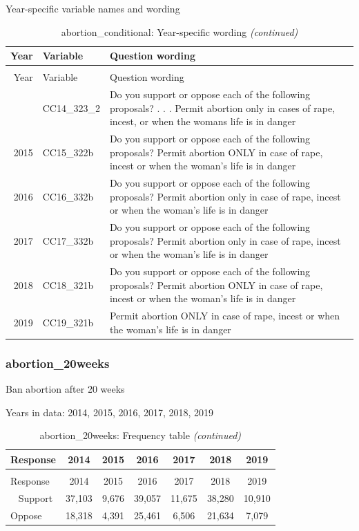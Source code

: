 \documentclass[12pt]{article}
\begin{document}
\endgroup{}

Year-specific variable names and wording

\begin{longtable}[t]{rl>{\raggedright\arraybackslash}p{10cm}}
\caption{\label{tab:unnamed-chunk-4}abortion\_conditional: Year-specific wording}\\
\toprule
Year & Variable & Question wording\\
\midrule
\endfirsthead
\caption[]{abortion\_conditional: Year-specific wording \textit{(continued)}}\\
\toprule
Year & Variable & Question wording\\
\midrule
\endhead
\
\endfoot
\bottomrule
\endlastfoot
2014 & CC14\_323\_2 & Do you support or oppose each of the following proposals? . . . Permit abortion only in cases of rape, incest, or when the womans life is in danger\\
2015 & CC15\_322b & Do you support or oppose each of the following proposals? Permit abortion ONLY in case of rape, incest or when the woman's life is in danger\\
2016 & CC16\_332b & Do you support or oppose each of the following proposals? Permit abortion only in case of rape, incest or when the woman's life is in danger\\
2017 & CC17\_332b & Do you support or oppose each of the following proposals? Permit abortion only in case of rape, incest or when the woman's life is in danger\\
2018 & CC18\_321b & Do you support or oppose each of the following proposals? Permit abortion ONLY in case of rape, incest or when the woman's life is in danger\\
2019 & CC19\_321b & Permit abortion ONLY in case of rape, incest or when the woman's life is in danger\\*
\end{longtable}

\subsubsection{abortion\_20weeks}\label{abortion_20weeks}

Ban abortion after 20 weeks

Years in data: 2014, 2015, 2016, 2017, 2018,
2019\begingroup\fontsize{10}{12}\selectfont

\begin{longtable}[t]{lcccccc}
\caption{\label{tab:unnamed-chunk-4}abortion\_20weeks: Frequency table}\\
\toprule
Response & 2014 & 2015 & 2016 & 2017 & 2018 & 2019\\
\midrule
\endfirsthead
\caption[]{abortion\_20weeks: Frequency table \textit{(continued)}}\\
\toprule
Response & 2014 & 2015 & 2016 & 2017 & 2018 & 2019\\
\midrule
\endhead
\
\endfoot
\bottomrule
\endlastfoot
Support & 37,103 & 9,676 & 39,057 & 11,675 & 38,280 & 10,910\\
Oppose & 18,318 & 4,391 & 25,461 & 6,506 & 21,634 & 7,079\\*
\end{longtable}
\end{document}

